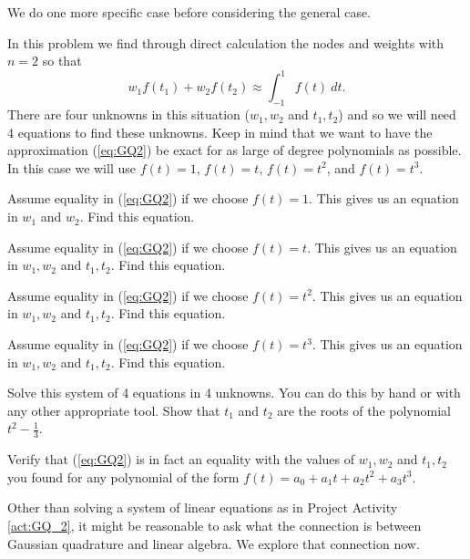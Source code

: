 We do one more specific case before considering the general case.


\begin{pactivity} \label{act:GQ_2} In this problem we find through direct calculation the nodes and weights with $n=2$ so that
\begin{equation}
w_1f(t_1) + w_2f(t_2) \approx \int_{-1}^1 f(t) \ dt. \label{eq:GQ2}
\end{equation}
There are four unknowns in this situation ($w_1, w_2$ and $t_1, t_2$) and so we will need 4 equations to find these unknowns. Keep in mind that we want to have the approximation (\ref{eq:GQ2}) be exact for as large of degree polynomials as possible. In this case we will use $f(t)=1$, $f(t)=t$, $f(t)=t^2$, and $f(t)=t^3$.
	\ba
	\item Assume equality in (\ref{eq:GQ2}) if we choose $f(t) = 1$. This gives us an equation in $w_1$ and $w_2$. Find this equation.
	

	\item Assume equality in (\ref{eq:GQ2}) if we choose $f(t) = t$. This gives us an equation in $w_1, w_2$ and $t_1,t_2$. Find this equation.
	

	\item Assume equality in (\ref{eq:GQ2}) if we choose $f(t) = t^2$. This gives us an equation in $w_1, w_2$ and $t_1,t_2$. Find this equation.
	
	\item Assume equality in (\ref{eq:GQ2}) if we choose $f(t) = t^3$. This gives us an equation in $w_1, w_2$ and $t_1,t_2$. Find this equation.
	
	\item Solve this system of 4 equations in 4 unknowns. You can do this by hand or with any other appropriate tool. Show that $t_1$ and $t_2$ are the roots of the polynomial $t^2 - \frac{1}{3}$.
	
	\item Verify that (\ref{eq:GQ2}) is in fact an equality with the values of $w_1, w_2$ and $t_1, t_2$ you found for any polynomial of the form $f(t) = a_0+a_1t+a_2t^2 + a_3t^3$.

	\ea

\end{pactivity}

Other than solving a system of linear equations as in Project Activity \ref{act:GQ_2}, it might be reasonable to ask what the connection is between Gaussian quadrature and linear algebra. We explore that connection now.

